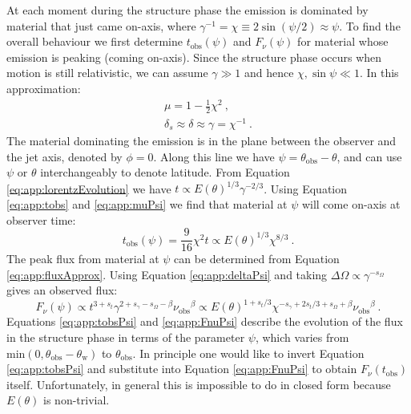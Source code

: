 \documentclass[twocolumn]{aastex62}
\newcommand{\tobs}{\ensuremath{t_{\mathrm{obs}}}}
\newcommand{\nuobs}{\ensuremath{\nu_{\mathrm{obs}}}}
\newcommand{\thobs}{\ensuremath{\theta_{\mathrm{obs}}}}
\newcommand{\thW}{\ensuremath{\theta_{\mathrm{w}}}}
\newcommand{\som}{\ensuremath{s_{\Omega}}}
\begin{document}
At each moment during the structure phase the emission is dominated by material that just came on-axis, where $\gamma^{-1} = \chi \equiv 2\sin (\psi/2) \approx \psi$.  To find the overall behaviour we first determine $\tobs(\psi)$ and $F_\nu(\psi)$ for material whose emission is peaking (coming on-axis).  Since the structure phase occurs when motion is still relativistic, we can assume $\gamma \gg 1$ and hence $\chi, \sin \psi \ll 1$.  In this approximation:
\begin{eqnarray}
	\mu = 1 - \frac{1}{2}\chi^2 \ , \label{eq:app:muPsi}\\
	\delta_s \approx \delta \approx \gamma = \chi^{-1} \ . \label{eq:app:deltaPsi}
\end{eqnarray}
The material dominating the emission is in the plane between the observer and the jet axis, denoted by $\phi = 0$. Along this line we have $\psi = \thobs - \theta$, and can use $\psi$ or $\theta$ interchangeably to denote latitude.  From Equation \eqref{eq:app:lorentzEvolution} we have $t\propto E(\theta)^{1/3} \gamma^{-2/3}$.  Using Equation \eqref{eq:app:tobs} and \eqref{eq:app:muPsi} we find that material at $\psi$ will come on-axis at observer time:
\begin{equation}
	\tobs(\psi) = \frac{9}{16} \chi^2 t \propto E(\theta)^{1/3} \chi^{8/3}\ . \label{eq:app:tobsPsi}
\end{equation}
The peak flux from material at $\psi$ can be determined from Equation \eqref{eq:app:fluxApprox}.  Using Equation \eqref{eq:app:deltaPsi} and taking $\Delta \Omega \propto \gamma^{-\som}$ gives an observed flux:
\begin{equation}
	F_\nu(\psi) \propto t^{3+s_t} \gamma^{2+s_\gamma-\som-\beta} \nuobs^\beta \propto E(\theta)^{1+s_t/3} \chi^{-s_\gamma + 2 s_t/3 +\som+\beta} \nuobs^\beta  \ . \label{eq:app:FnuPsi}
\end{equation}
	Equations \eqref{eq:app:tobsPsi} and \eqref{eq:app:FnuPsi} describe the evolution of the flux in the structure phase in terms of the parameter $\psi$, which varies from $\mathrm{min} (0, \thobs-\thW)$ to $\thobs$.  In principle one would like to invert Equation \eqref{eq:app:tobsPsi} and substitute into Equation \eqref{eq:app:FnuPsi} to obtain $F_\nu(\tobs)$ itself.  Unfortunately, in general this is impossible to do in closed form because $E(\theta)$ is non-trivial. 
	
\end{document}
